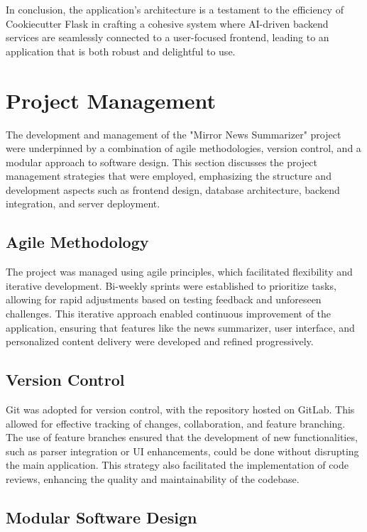 \documentclass[10pt]{article}
\begin{document}
In conclusion, the application's architecture is a testament to the efficiency of Cookiecutter Flask in crafting a cohesive system where AI-driven backend services are seamlessly connected to a user-focused frontend, leading to an application that is both robust and delightful to use.

\section{Project Management}

The development and management of the "Mirror News Summarizer" project were underpinned by a combination of agile methodologies, version control, and a modular approach to software design. This section discusses the project management strategies that were employed, emphasizing the structure and development aspects such as frontend design, database architecture, backend integration, and server deployment.

\subsection{Agile Methodology}

The project was managed using agile principles, which facilitated flexibility and iterative development. Bi-weekly sprints were established to prioritize tasks, allowing for rapid adjustments based on testing feedback and unforeseen challenges. This iterative approach enabled continuous improvement of the application, ensuring that features like the news summarizer, user interface, and personalized content delivery were developed and refined progressively.

\subsection{Version Control}

Git was adopted for version control, with the repository hosted on GitLab. This allowed for effective tracking of changes, collaboration, and feature branching. The use of feature branches ensured that the development of new functionalities, such as parser integration or UI enhancements, could be done without disrupting the main application. This strategy also facilitated the implementation of code reviews, enhancing the quality and maintainability of the codebase.

\subsection{Modular Software Design}
\end{document}
